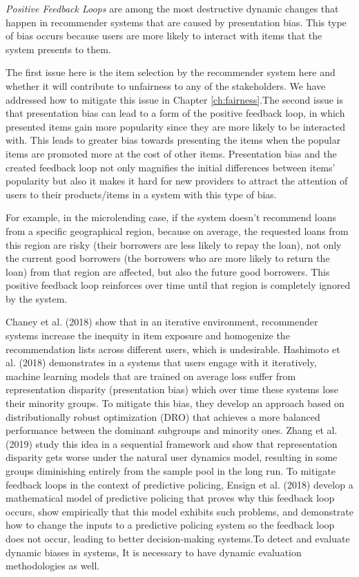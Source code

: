         \textit{Positive Feedback Loops} are among the most destructive dynamic changes that happen in recommender systems \cite{o2016weapons} that are caused by presentation bias. This type of bias occurs because users are more likely to interact with items that the system presents to them. 
        
        The first issue here is the item selection by the recommender system here and whether it will contribute to unfairness to any of the stakeholders. We have addressed how to mitigate this issue in Chapter \ref{ch:fairness}.The second issue is that presentation bias can lead to a form of the positive feedback loop, in which presented items gain more popularity since they are more likely to be interacted with. This leads to greater bias towards presenting the items when the popular items are promoted more at the cost of other items. Presentation bias and the created feedback loop not only magnifies the initial differences between items' popularity but also it makes it hard for new providers to attract the attention of users to their products/items in a system with this type of bias.
    
        For example, in the microlending case, if the system doesn't recommend loans from a specific geographical region, because on average, the requested loans from this region are risky (their borrowers are less likely to repay the loan), not only the current good borrowers (the borrowers who are more likely to return the loan) from that region are affected, but also the future good borrowers. This positive feedback loop reinforces over time until that region is completely ignored by the system.
        
        Chaney et al. (2018) \cite{Chaney2018Homo} show that in an iterative environment, recommender systems increase the inequity in item exposure and homogenize the recommendation lists across different users, which is undesirable. Hashimoto et al. (2018) \cite{pmlr-v80-hashimoto18a} demonstrates in a systems that users engage with it iteratively, machine learning models that are trained on average loss suffer from representation disparity (presentation bias) which over time these systems lose their minority groups. To mitigate this bias, they develop an approach based on distributionally robust optimization (DRO) that achieves a more balanced performance between the dominant subgroups and minority ones. Zhang et al. (2019) \cite{NEURIPS2019_7690dd4d} study this idea in a sequential framework and show that representation disparity gets worse under the natural user dynamics model, resulting in some groups diminishing entirely from the sample pool in the long run. To mitigate feedback loops in the context of predictive policing, Ensign et al. (2018) \cite{pmlr-v81-ensign18a} develop a mathematical model of predictive policing that proves why this feedback loop occurs, show empirically that this model exhibits such problems, and demonstrate how to change the inputs to a predictive policing system so the feedback loop does not occur, leading to better decision-making systems.To detect and evaluate dynamic biases in systems, It is necessary to have dynamic evaluation methodologies as well.
        
